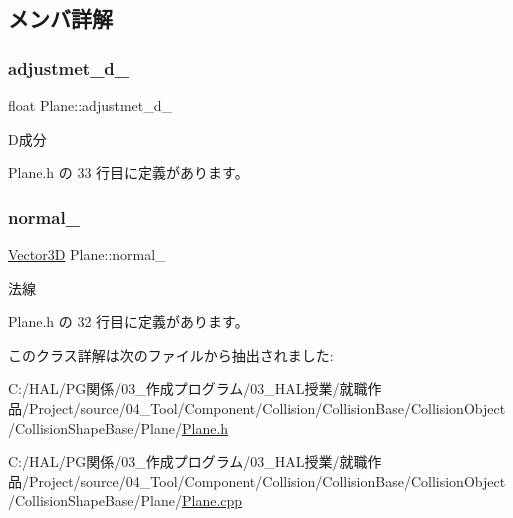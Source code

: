 \subsection{メンバ詳解}
\mbox{\label{class_plane_ab43e3263bd879ea710936d85cacb6006}} 
\subsubsection{\texorpdfstring{adjustmet\+\_\+d\+\_\+}{adjustmet\_d\_}}
{\footnotesize\ttfamily float Plane\+::adjustmet\+\_\+d\+\_\+\hspace{0.3cm}{\ttfamily [private]}}



D成分 



 Plane.\+h の 33 行目に定義があります。

\mbox{\label{class_plane_a7ae74465500dfdd7a68fa2eb28486ae0}} 
\subsubsection{\texorpdfstring{normal\+\_\+}{normal\_}}
{\footnotesize\ttfamily \mbox{\hyperlink{class_vector3_d}{Vector3D}} Plane\+::normal\+\_\+\hspace{0.3cm}{\ttfamily [private]}}



法線 



 Plane.\+h の 32 行目に定義があります。



このクラス詳解は次のファイルから抽出されました\+:\begin{DoxyCompactItemize}
\item 
C\+:/\+H\+A\+L/\+P\+G関係/03\+\_\+作成プログラム/03\+\_\+\+H\+A\+L授業/就職作品/\+Project/source/04\+\_\+\+Tool/\+Component/\+Collision/\+Collision\+Base/\+Collision\+Object/\+Collision\+Shape\+Base/\+Plane/\mbox{\hyperlink{_plane_8h}{Plane.\+h}}\item 
C\+:/\+H\+A\+L/\+P\+G関係/03\+\_\+作成プログラム/03\+\_\+\+H\+A\+L授業/就職作品/\+Project/source/04\+\_\+\+Tool/\+Component/\+Collision/\+Collision\+Base/\+Collision\+Object/\+Collision\+Shape\+Base/\+Plane/\mbox{\hyperlink{_plane_8cpp}{Plane.\+cpp}}\end{DoxyCompactItemize}
